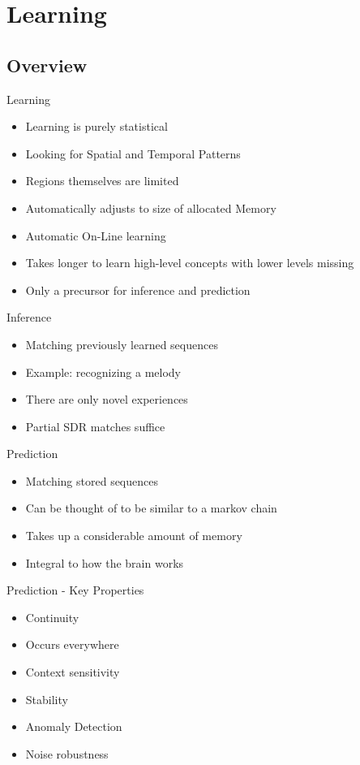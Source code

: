 \section{Learning}

\subsection{Overview}

\begin{frame}[c]{Learning}
    \begin{itemize}[<+(1)->]
        \item Learning is purely statistical
        \item Looking for Spatial and Temporal Patterns
        \item Regions themselves are limited
        \item Automatically adjusts to size of allocated Memory
        \item Automatic On-Line learning
        \item Takes longer to learn high-level concepts with lower levels missing
        \item Only a precursor for inference and prediction
    \end{itemize}
\end{frame}


\begin{frame}[c]{Inference}
    \Large
    \begin{itemize}[<+(1)->]
        \item Matching previously learned sequences
        \item Example: recognizing a melody
        \item There are only novel experiences
        \item Partial SDR matches suffice
    \end{itemize}
\end{frame}


\begin{frame}[c]{Prediction}
    \Large
    \begin{itemize}[<+(1)->]
        \item Matching stored sequences
        \item Can be thought of to be similar to a markov chain
        \item Takes up a considerable amount of memory
        \item Integral to how the brain works
    \end{itemize}
\end{frame}


\begin{frame}[c]{Prediction - Key Properties}
    \Large
    \begin{itemize}[<+(1)->]
        \item Continuity
        \item Occurs everywhere
        \item Context sensitivity
        \item Stability
        \item Anomaly Detection
        \item Noise robustness
    \end{itemize}
\end{frame}




